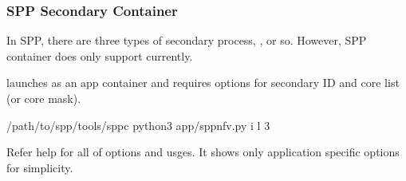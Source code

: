 \documentclass[a4paper,11pt,openany,oneside,english]{sphinxmanual}
\begin{document}
\begin{sphinxVerbatim}[commandchars=\\\{\},formatcom=\footnotesize]
\end{sphinxVerbatim}


\subsubsection{SPP Secondary Container}
\label{\detokenize{tools/sppc/app_launcher:spp-secondary-container}}\label{\detokenize{tools/sppc/app_launcher:sppc-appl-spp-secondary}}
In SPP, there are three types of secondary process, ,
 or so.
However, SPP container does only support  currently.

 launches  as an app container and requires
options for secondary ID and core list (or core mask).

\begin{sphinxVerbatim}[commandchars=\\\{\},formatcom=\footnotesize]
  /path/to/spp/tools/sppc
 python3 app/spp\PYGZhy{}nfv.py \PYGZhy{}i  \PYGZhy{}l \PYGZhy{}3
\end{sphinxVerbatim}

Refer help for all of options and usges.
It shows only application specific options for simplicity.
\end{document}
